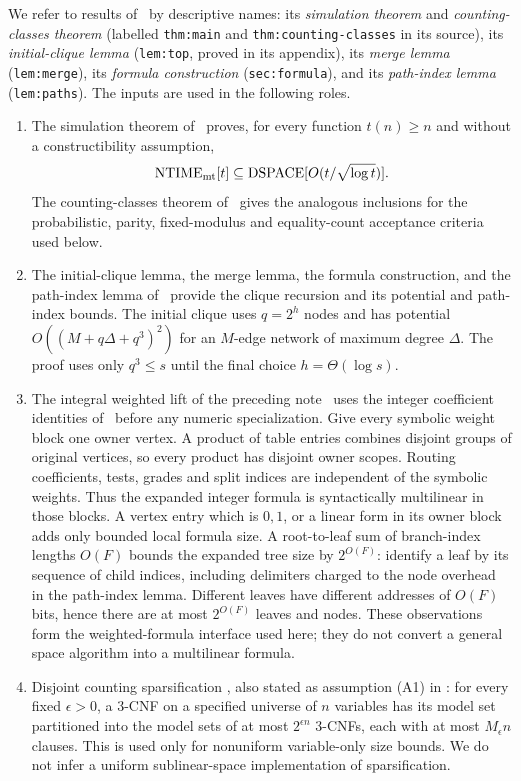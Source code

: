 \documentclass[11pt]{article}
\theoremstyle{definition}
\theoremstyle{remark}
\begin{document}
We refer to results of~\cite{Cruz26} by descriptive names: its
\emph{simulation theorem} and \emph{counting-classes theorem} (labelled
\texttt{thm:main} and \texttt{thm:counting-classes} in its source), its
\emph{initial-clique lemma} (\texttt{lem:top}, proved in its appendix),
its \emph{merge lemma} (\texttt{lem:merge}), its \emph{formula
construction} (\texttt{sec:formula}), and its \emph{path-index lemma}
(\texttt{lem:paths}). The inputs are used in the following roles.
\begin{enumerate}
\item The simulation theorem of~\cite{Cruz26} proves, for every function
$t(n)\ge n$ and without a constructibility assumption,
\[
 \mathrm{NTIME}_{\rm mt}[t]\subseteq
 \mathrm{DSPACE}[O(t/\sqrt{\log t})].
\]
The counting-classes theorem of~\cite{Cruz26} gives the analogous
inclusions for the probabilistic, parity, fixed-modulus and
equality-count acceptance criteria used below.
\item The initial-clique lemma, the merge lemma, the formula
construction, and the path-index lemma of~\cite{Cruz26} provide the
clique recursion and its potential and path-index bounds. The initial
clique uses $q=2^h$ nodes and has potential
$O((M+q\Delta+q^3)^2)$ for an $M$-edge network of maximum degree
$\Delta$. The proof uses only $q^3\le s$ until the final choice
$h=\Theta(\log s)$.
\item The integral weighted lift of the preceding
note~\cite{PreviousNote} uses the integer coefficient identities
of~\cite{Cruz26} before any numeric specialization. Give every symbolic
weight block one owner vertex. A product of table entries combines
disjoint groups of original vertices, so every product has disjoint
owner scopes. Routing coefficients, tests, grades and split indices
are independent of the symbolic weights. Thus the expanded integer
formula is syntactically multilinear in those blocks. A vertex entry
which is $0,1$, or a linear form in its owner block adds only bounded
local formula size. A root-to-leaf sum of branch-index lengths
$O(F)$ bounds the expanded tree size by $2^{O(F)}$: identify a leaf
by its sequence of child indices, including delimiters charged to
the node overhead in the path-index lemma. Different leaves have
different addresses of $O(F)$ bits, hence there are at most $2^{O(F)}$
leaves and nodes. These observations form the weighted-formula
interface used here; they do not convert a general space algorithm
into a multilinear formula.
\item Disjoint counting sparsification \cite[Lemma~4]{Ant26}, also
stated as assumption (A1) in \cite[Section~2]{Szeider26}: for every
fixed $\epsilon>0$, a 3-CNF on a specified universe of $n$ variables
has its model set partitioned into the model sets of at most
$2^{\epsilon n}$ 3-CNFs, each with at most $M_\epsilon n$ clauses.
This is used only for nonuniform variable-only size bounds. We do not
infer a uniform sublinear-space implementation of sparsification.
\end{enumerate}
\end{document}
